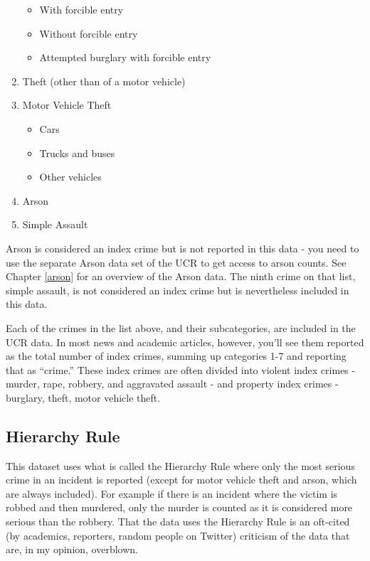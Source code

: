 \documentclass[
  12pt,
  openany]{book}
\providecommand{\tightlist}{%
  \setlength{\itemsep}{0pt}\setlength{\parskip}{0pt}}
\begin{document}
\begin{enumerate}
  \begin{itemize}
  \tightlist
  \item
    With forcible entry\\
  \item
    Without forcible entry\\
  \item
    Attempted burglary with forcible entry\\
  \end{itemize}
\item
  Theft (other than of a motor vehicle)\\
\item
  Motor Vehicle Theft

  \begin{itemize}
  \tightlist
  \item
    Cars\\
  \item
    Trucks and buses\\
  \item
    Other vehicles\\
  \end{itemize}
\item
  Arson\\
\item
  Simple Assault
\end{enumerate}

Arson is considered an index crime but is not reported in this data - you need to use the separate Arson data set of the UCR to get access to arson counts. See Chapter \ref{arson} for an overview of the Arson data. The ninth crime on that list, simple assault, is not considered an index crime but is nevertheless included in this data.

Each of the crimes in the list above, and their subcategories, are included in the UCR data. In most news and academic articles, however, you'll see them reported as the total number of index crimes, summing up categories 1-7 and reporting that as ``crime.'' These index crimes are often divided into violent index crimes - murder, rape, robbery, and aggravated assault - and property index crimes - burglary, theft, motor vehicle theft.

\hypertarget{hierarchy}{%
\subsection{Hierarchy Rule}\label{hierarchy}}

This dataset uses what is called the Hierarchy Rule where only the most serious crime in an incident is reported (except for motor vehicle theft and arson, which are always included). For example if there is an incident where the victim is robbed and then murdered, only the murder is counted as it is considered more serious than the robbery. That the data uses the Hierarchy Rule is an oft-cited (by academics, reporters, random people on Twitter) criticism of the data that are, in my opinion, overblown.
\end{document}
